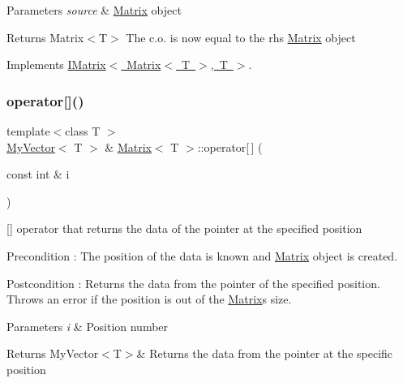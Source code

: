 \begin{DoxyParams}{Parameters}
{\em source} & \mbox{\hyperlink{class_matrix}{Matrix}} object \\
\hline
\end{DoxyParams}
\begin{DoxyReturn}{Returns}
Matrix$<$\+T$>$ The c.\+o. is now equal to the rhs \mbox{\hyperlink{class_matrix}{Matrix}} object 
\end{DoxyReturn}


Implements \mbox{\hyperlink{class_i_matrix_a9eeb68de7e1d37d1aab439c78fea9be3}{I\+Matrix$<$ Matrix$<$ T $>$, T $>$}}.

\mbox{\label{class_matrix_aa9532c87a69bef256954e2309ca3fdd6}} 
\subsubsection{\texorpdfstring{operator[]()}{operator[]()}\hspace{0.1cm}{\footnotesize\ttfamily [1/2]}}
{\footnotesize\ttfamily template$<$class T $>$ \\
\mbox{\hyperlink{class_my_vector}{My\+Vector}}$<$ T $>$ \& \mbox{\hyperlink{class_matrix}{Matrix}}$<$ T $>$\+::operator\mbox{[}$\,$\mbox{]} (\begin{DoxyParamCaption}\item[{const int \&}]{i }\end{DoxyParamCaption})\hspace{0.3cm}{\ttfamily [virtual]}}



\mbox{[}\mbox{]} operator that returns the data of the pointer at the specified position 

\begin{DoxyPrecond}{Precondition}
\+: The position of the data is known and \mbox{\hyperlink{class_matrix}{Matrix}} object is created. 
\end{DoxyPrecond}
\begin{DoxyPostcond}{Postcondition}
\+: Returns the data from the pointer of the specified position. Throws an error if the position is out of the \mbox{\hyperlink{class_matrix}{Matrix}}\textquotesingle{}s size. 
\end{DoxyPostcond}

\begin{DoxyParams}{Parameters}
{\em i} & Position number \\
\hline
\end{DoxyParams}
\begin{DoxyReturn}{Returns}
My\+Vector$<$\+T$>$\& Returns the data from the pointer at the specific position 
\end{DoxyReturn}


